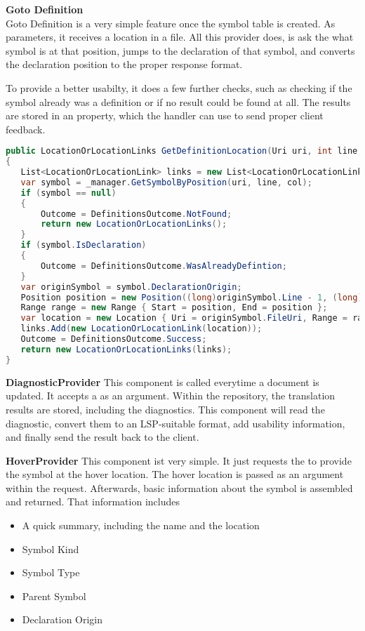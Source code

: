 \textbf{Goto Definition}\\
Goto Definition is a very simple feature once the symbol table is created.
As parameters, it receives a location in a file.
All this provider does, is ask the  what symbol is at that position, jumps to the declaration of that symbol, and converts the declaration position to the proper response format.

To provide a better usabilty, it does a few further checks, such as checking if the symbol already was a definition or if no result could be found at all.
The results are stored in an  property, which the handler can use to send proper client feedback.

\begin{lstlisting}[language=csharp, caption={Providing Goto Definition}, captionpos=b, label={lst:gotoCore}]
public LocationOrLocationLinks GetDefinitionLocation(Uri uri, int line, int col)
{
   List<LocationOrLocationLink> links = new List<LocationOrLocationLink>();
   var symbol = _manager.GetSymbolByPosition(uri, line, col);
   if (symbol == null)
   {
       Outcome = DefinitionsOutcome.NotFound;
       return new LocationOrLocationLinks();
   }
   if (symbol.IsDeclaration)
   {
       Outcome = DefinitionsOutcome.WasAlreadyDefintion;
   }
   var originSymbol = symbol.DeclarationOrigin;
   Position position = new Position((long)originSymbol.Line - 1, (long)originSymbol.ColumnStart - 1);
   Range range = new Range { Start = position, End = position };
   var location = new Location { Uri = originSymbol.FileUri, Range = range };
   links.Add(new LocationOrLocationLink(location));
   Outcome = DefinitionsOutcome.Success;
   return new LocationOrLocationLinks(links);
}
\end{lstlisting}

\textbf{DiagnosticProvider}
This component is called everytime a document is updated.
It accepts a  as an argument.
Within the repository, the translation results are stored, including the diagnostics.
This component will read the diagnostic, convert them to an LSP-suitable format, add usability information, and finally send the result back to the client.

\intnote{}

\textbf{HoverProvider}
This component ist very simple.
It just requests the  to provide the symbol at the hover location.
The hover location is passed as an argument within the request.
Afterwards, basic information about the symbol is assembled and returned.
That information includes \begin{itemize}
    \item A quick summary, including the name and the location
    \item Symbol Kind
    \item Symbol Type
    \item Parent Symbol
    \item Declaration Origin
\end{itemize}

